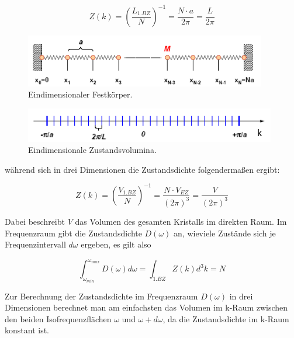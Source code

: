 \begin{equation}
    Z(k) = \left( \frac{L_{1.BZ}}{N} \right)^{-1} = \frac{N \cdot a}{2 \pi} = \frac{L}{2 \pi}
\end{equation}

\begin{figure}[H]
    \centering
    \includegraphics[width=.75\textwidth]{resources/31-10-2013/real.png}
    \caption{Eindimensionaler Festkörper.}
    \label{fig:q88:real}
\end{figure}

\begin{figure}[H]
    \centering
    \includegraphics[width=.75\textwidth]{resources/31-10-2013/k.png}
    \caption{Eindimensionale Zustandsvolumina.}
    \label{fig:q88:k}
\end{figure}

während sich in drei Dimensionen die Zustandsdichte folgendermaßen ergibt:

\begin{equation}
    Z(k) = \left( \frac{V_{1.BZ}}{N} \right)^{-1} = \frac{N \cdot V_{EZ}}{(2 \pi)^3} = \frac{V}{(2 \pi)^3}
\end{equation}

Dabei beschreibt $V$ das Volumen des gesamten Kristalls im direkten Raum.
Im Frequenzraum gibt die Zustandsdichte $D(\omega)$ an, wieviele Zustände sich je Frequenzintervall $d \omega$ ergeben, es gilt also

\begin{equation}
    \int_{\omega_{min}}^{\omega_{max}} D(\omega) d \omega = \int_{1.BZ} Z(k) d^3 k = N
\end{equation}

Zur Berechnung der Zustandsdichte im Frequenzraum $D(\omega)$ in drei Dimensionen berechnet man am einfachsten das Volumen im k-Raum zwischen den beiden Isofrequenzflächen $\omega$ und $\omega + d \omega$, da die Zustandsdichte im k-Raum konstant ist.

